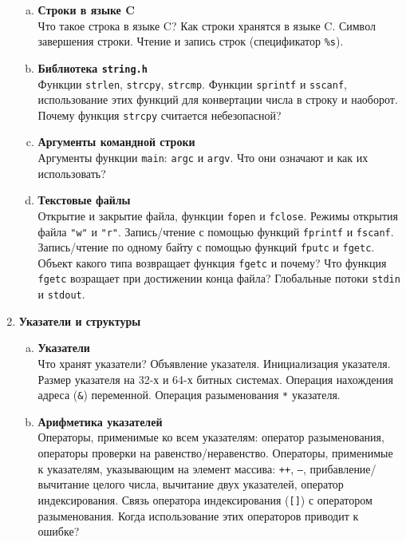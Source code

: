 \documentclass{article}
\begin{document}
\begin{enumerate}
\begin{enumerate}[a.]
\item \textbf{Строки в языке C}\\
Что такое строка в языке C? Как строки хранятся в языке C. Символ завершения строки. Чтение и запись строк (спецификатор \texttt{\%s}).

\item \textbf{Библиотека \texttt{string.h}}\\
Функции \texttt{strlen}, \texttt{strcpy}, \texttt{strcmp}. Функции \texttt{sprintf} и \texttt{sscanf}, использование этих функций для конвертации числа в строку и наоборот. Почему функция \texttt{strcpy} считается небезопасной?

\item \textbf{Аргументы командной строки}\\
Аргументы функции \texttt{main}: \texttt{argc} и \texttt{argv}. Что они означают и как их использовать?

\item \textbf{Текстовые файлы}\\
Открытие и закрытие файла, функции \texttt{fopen} и \texttt{fclose}. Режимы открытия файла \texttt{"w"} и \texttt{"r"}.
Запись/чтение с помощью функций \texttt{fprintf} и \texttt{fscanf}. Запись/чтение по одному байту с помощью функций \texttt{fputc} и \texttt{fgetc}. Объект какого типа возвращает функция \texttt{fgetc} и почему? Что функция \texttt{fgetc} возращает при достижении конца файла? Глобальные потоки \texttt{stdin} и \texttt{stdout}.
\end{enumerate}





\item \textbf{Указатели и структуры}
\begin{enumerate}[a.]
\item \textbf{Указатели}\\
Что хранят указатели? Объявление указателя. Инициализация указателя. Размер указателя на 32-х и 64-х битных системах. Операция нахождения адреса (\texttt{\&}) переменной. Операция разыменования \texttt{*} указателя.

\item \textbf{Арифметика указателей}\\
Операторы, применимые ко всем указателям: оператор разыменования, операторы проверки на равенство/неравенство. Операторы, применимые к указателям, указывающим на элемент массива: \texttt{++}, \texttt{--}, прибавление/вычитание целого числа, вычитание двух указателей, оператор индексирования. Связь оператора индексирования (\texttt{[]}) с оператором разыменования. Когда использование этих операторов приводит к ошибке?


\end{enumerate}
\end{enumerate}
\end{document}
